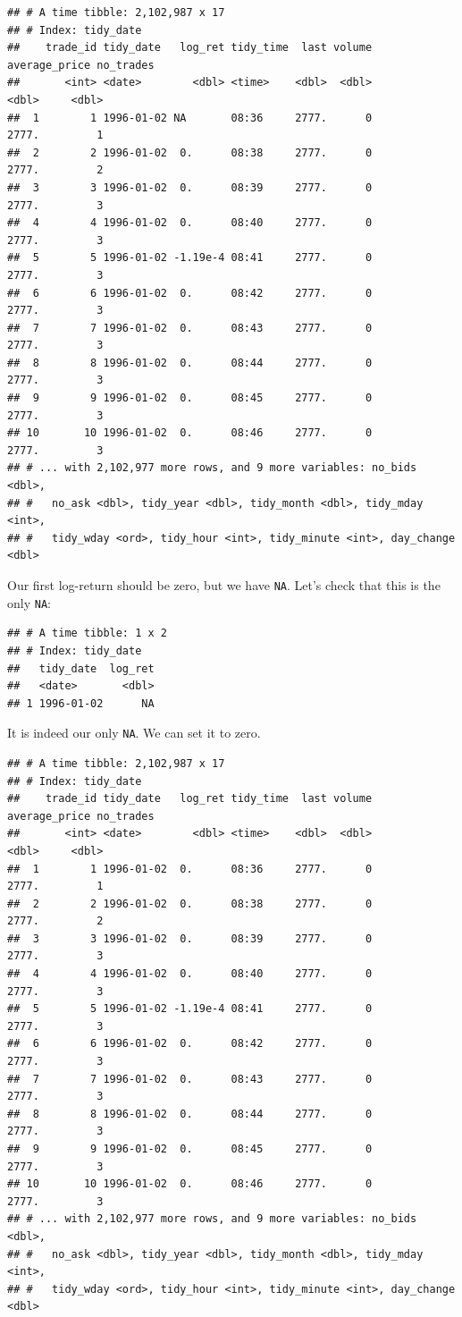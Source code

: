 \documentclass[]{elsarticle} %
\begin{document}
\begin{verbatim}
## # A time tibble: 2,102,987 x 17
## # Index: tidy_date
##    trade_id tidy_date   log_ret tidy_time  last volume average_price no_trades
##       <int> <date>        <dbl> <time>    <dbl>  <dbl>         <dbl>     <dbl>
##  1        1 1996-01-02 NA       08:36     2777.      0         2777.         1
##  2        2 1996-01-02  0.      08:38     2777.      0         2777.         2
##  3        3 1996-01-02  0.      08:39     2777.      0         2777.         3
##  4        4 1996-01-02  0.      08:40     2777.      0         2777.         3
##  5        5 1996-01-02 -1.19e-4 08:41     2777.      0         2777.         3
##  6        6 1996-01-02  0.      08:42     2777.      0         2777.         3
##  7        7 1996-01-02  0.      08:43     2777.      0         2777.         3
##  8        8 1996-01-02  0.      08:44     2777.      0         2777.         3
##  9        9 1996-01-02  0.      08:45     2777.      0         2777.         3
## 10       10 1996-01-02  0.      08:46     2777.      0         2777.         3
## # ... with 2,102,977 more rows, and 9 more variables: no_bids <dbl>,
## #   no_ask <dbl>, tidy_year <dbl>, tidy_month <dbl>, tidy_mday <int>,
## #   tidy_wday <ord>, tidy_hour <int>, tidy_minute <int>, day_change <dbl>
\end{verbatim}

Our first log-return should be zero, but we have \texttt{NA}. Let's
check that this is the only \texttt{NA}:

\begin{verbatim}
## # A time tibble: 1 x 2
## # Index: tidy_date
##   tidy_date  log_ret
##   <date>       <dbl>
## 1 1996-01-02      NA
\end{verbatim}

It is indeed our only \texttt{NA}. We can set it to zero.

\begin{verbatim}
## # A time tibble: 2,102,987 x 17
## # Index: tidy_date
##    trade_id tidy_date   log_ret tidy_time  last volume average_price no_trades
##       <int> <date>        <dbl> <time>    <dbl>  <dbl>         <dbl>     <dbl>
##  1        1 1996-01-02  0.      08:36     2777.      0         2777.         1
##  2        2 1996-01-02  0.      08:38     2777.      0         2777.         2
##  3        3 1996-01-02  0.      08:39     2777.      0         2777.         3
##  4        4 1996-01-02  0.      08:40     2777.      0         2777.         3
##  5        5 1996-01-02 -1.19e-4 08:41     2777.      0         2777.         3
##  6        6 1996-01-02  0.      08:42     2777.      0         2777.         3
##  7        7 1996-01-02  0.      08:43     2777.      0         2777.         3
##  8        8 1996-01-02  0.      08:44     2777.      0         2777.         3
##  9        9 1996-01-02  0.      08:45     2777.      0         2777.         3
## 10       10 1996-01-02  0.      08:46     2777.      0         2777.         3
## # ... with 2,102,977 more rows, and 9 more variables: no_bids <dbl>,
## #   no_ask <dbl>, tidy_year <dbl>, tidy_month <dbl>, tidy_mday <int>,
## #   tidy_wday <ord>, tidy_hour <int>, tidy_minute <int>, day_change <dbl>
\end{verbatim}
\end{document}
